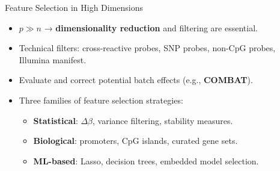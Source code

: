 \documentclass[8pt]{beamer}
\begin{document}
\begin{frame}{Feature Selection in High Dimensions}

    \begin{itemize}[label=-]
        \item $p \gg n$ → \textbf{dimensionality reduction} and filtering are essential.
        \item Technical filters: cross-reactive probes, SNP probes, non-CpG probes, Illumina manifest.
        \item Evaluate and correct potential batch effects (e.g., \textbf{COMBAT}).
        \item Three families of feature selection strategies:
        \begin{itemize}[label=-]
            \item \textbf{Statistical}: $\Delta\beta$, variance filtering, stability measures.
            \item \textbf{Biological}: promoters, CpG islands, curated gene sets.
            \item \textbf{ML-based}: Lasso, decision trees, embedded model selection.
        \end{itemize}
    \end{itemize}





\end{frame}
\end{document}
